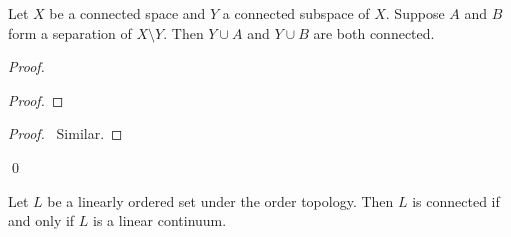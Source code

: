 \begin{proposition}
    Let $X$ be a connected space and $Y$ a connected subspace of $X$. Suppose $A$ and $B$ form a separation of $X \setminus Y$. Then $Y \cup A$ and $Y \cup B$ are both connected.
\end{proposition}

\begin{proof}
    \pf
    \begin{proof}
    \end{proof}
    \begin{proof}
        \pf\ Similar.
    \end{proof}
    \qed
\end{proof}

\begin{theorem}
    \label{theorem:connected_continuum}
    Let $L$ be a linearly ordered set under the order topology. Then $L$ is connected if and only if $L$ is a linear continuum.
\end{theorem}

